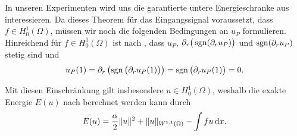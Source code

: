 In unseren Experimenten wird uns die garantierte untere Energieschranke aus
 interessieren. 
Da dieses Theorem für das Eingangssignal voraussetzt, dass $f\in
H^1_0(\Omega)$, müssen wir noch die folgenden Bedingungen an $u_P$ formulieren.
Hinreichend für $f\in H^1_0(\Omega)$ ist nach ,
dass  $u_P$, $\partial_r\big(\operatorname{sgn}(\partial_r u_P)\big)$ und $\operatorname{sgn}(\partial_r
u_P)$ stetig sind und 
\begin{align*}
  u_P(1)
  =
  \partial_r\left( \operatorname{sgn}\big(\partial_r u_P(1)\big)\right)
  =
  \operatorname{sgn}\big(\partial_r u_P(1)\big)
  =
  0.
\end{align*}

Mit diesen Einschränkung gilt insbesondere $u\in H^1_0(\Omega)$, weshalb 
die exakte Energie $E(u)$ nach  berechnet werden kann
durch 
\begin{align*}
  E(u)
  =
  \frac{\alpha}{2}\Vert u\Vert^2 + \Vert u\Vert_{W^{1,1}(\Omega)} 
  - \int fu\,\mathrm{d}x.
\end{align*}

